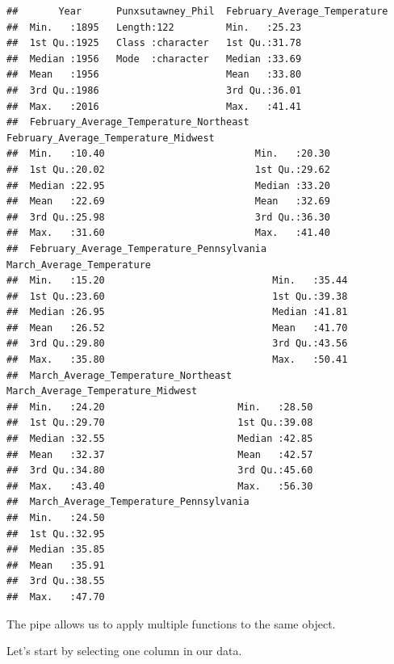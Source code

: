 \documentclass[
]{book}
\begin{document}
\begin{verbatim}
##       Year      Punxsutawney_Phil  February_Average_Temperature
##  Min.   :1895   Length:122         Min.   :25.23               
##  1st Qu.:1925   Class :character   1st Qu.:31.78               
##  Median :1956   Mode  :character   Median :33.69               
##  Mean   :1956                      Mean   :33.80               
##  3rd Qu.:1986                      3rd Qu.:36.01               
##  Max.   :2016                      Max.   :41.41               
##  February_Average_Temperature_Northeast February_Average_Temperature_Midwest
##  Min.   :10.40                          Min.   :20.30                       
##  1st Qu.:20.02                          1st Qu.:29.62                       
##  Median :22.95                          Median :33.20                       
##  Mean   :22.69                          Mean   :32.69                       
##  3rd Qu.:25.98                          3rd Qu.:36.30                       
##  Max.   :31.60                          Max.   :41.40                       
##  February_Average_Temperature_Pennsylvania March_Average_Temperature
##  Min.   :15.20                             Min.   :35.44            
##  1st Qu.:23.60                             1st Qu.:39.38            
##  Median :26.95                             Median :41.81            
##  Mean   :26.52                             Mean   :41.70            
##  3rd Qu.:29.80                             3rd Qu.:43.56            
##  Max.   :35.80                             Max.   :50.41            
##  March_Average_Temperature_Northeast March_Average_Temperature_Midwest
##  Min.   :24.20                       Min.   :28.50                    
##  1st Qu.:29.70                       1st Qu.:39.08                    
##  Median :32.55                       Median :42.85                    
##  Mean   :32.37                       Mean   :42.57                    
##  3rd Qu.:34.80                       3rd Qu.:45.60                    
##  Max.   :43.40                       Max.   :56.30                    
##  March_Average_Temperature_Pennsylvania
##  Min.   :24.50                         
##  1st Qu.:32.95                         
##  Median :35.85                         
##  Mean   :35.91                         
##  3rd Qu.:38.55                         
##  Max.   :47.70
\end{verbatim}

The pipe allows us to apply multiple functions to the same object.

Let's start by selecting one column in our data.
\end{document}
